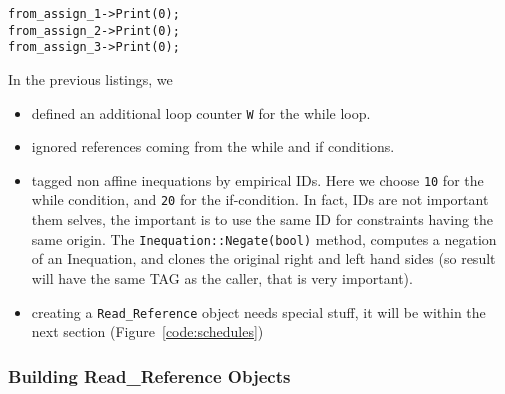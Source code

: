 \begin{lstlisting}[frame=single,framerule=0pt]
from_assign_1->Print(0);
from_assign_2->Print(0);
from_assign_3->Print(0);
\end{lstlisting}


In the previous listings, we 
\begin{itemize}
\item defined an additional loop counter \verb|W| for the while loop.
\item ignored references coming from the while and if conditions.
\item tagged non affine inequations by empirical IDs. Here we choose \verb|10| for the while condition, and \verb|20| for the if-condition. In fact, IDs are not important them selves, the important is to use the same ID for constraints having the same origin. The \verb|Inequation::Negate(bool)| method, computes a negation of an Inequation, and clones the original right and left hand sides (so result will have the same TAG as the caller, that is very important).
\item creating a \verb|Read_Reference| object needs special stuff, it will be within the next section (Figure~\ref{code:schedules})
\end{itemize}


% 
% 
% 
\subsubsection{Building Read\_Reference Objects}
